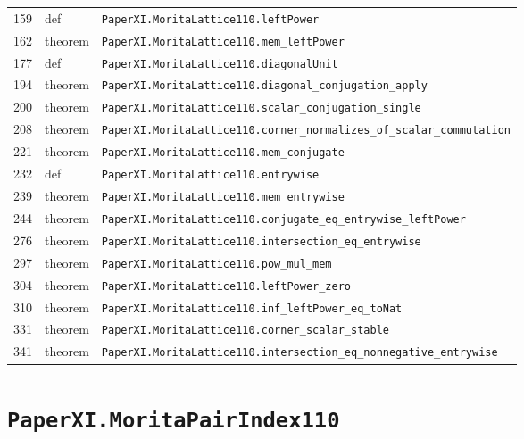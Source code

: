 \documentclass[10pt,oneside]{book}
\begin{document}
\begin{longtable}{@{}p{}p{}p{}@{}}
159&def&\nolinkurl{PaperXI.MoritaLattice110.leftPower}\\

162&theorem&\nolinkurl{PaperXI.MoritaLattice110.mem_leftPower}\\

177&def&\nolinkurl{PaperXI.MoritaLattice110.diagonalUnit}\\

194&theorem&\nolinkurl{PaperXI.MoritaLattice110.diagonal_conjugation_apply}\\

200&theorem&\nolinkurl{PaperXI.MoritaLattice110.scalar_conjugation_single}\\

208&theorem&\nolinkurl{PaperXI.MoritaLattice110.corner_normalizes_of_scalar_commutation}\\

221&theorem&\nolinkurl{PaperXI.MoritaLattice110.mem_conjugate}\\

232&def&\nolinkurl{PaperXI.MoritaLattice110.entrywise}\\

239&theorem&\nolinkurl{PaperXI.MoritaLattice110.mem_entrywise}\\

244&theorem&\nolinkurl{PaperXI.MoritaLattice110.conjugate_eq_entrywise_leftPower}\\

276&theorem&\nolinkurl{PaperXI.MoritaLattice110.intersection_eq_entrywise}\\

297&theorem&\nolinkurl{PaperXI.MoritaLattice110.pow_mul_mem}\\

304&theorem&\nolinkurl{PaperXI.MoritaLattice110.leftPower_zero}\\

310&theorem&\nolinkurl{PaperXI.MoritaLattice110.inf_leftPower_eq_toNat}\\

331&theorem&\nolinkurl{PaperXI.MoritaLattice110.corner_scalar_stable}\\

341&theorem&\nolinkurl{PaperXI.MoritaLattice110.intersection_eq_nonnegative_entrywise}\\

\bottomrule\end{longtable}

\section{\texorpdfstring{\nolinkurl{PaperXI.MoritaPairIndex110}}{PaperXI.MoritaPairIndex110}}\label{module:PaperXI.MoritaPairIndex110}
\end{document}
